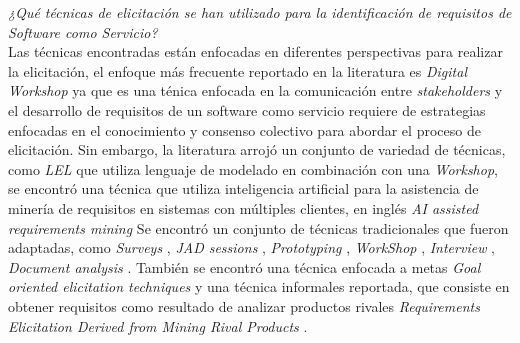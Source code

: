 \documentclass[conference,onecolumn,10pt]{IEEEtran}
\begin{document}
\emph{¿Qué técnicas de elicitación se han utilizado para la identificación de requisitos de Software como Servicio?} \\
Las técnicas encontradas están enfocadas en diferentes perspectivas para realizar la elicitación, el enfoque más 
frecuente reportado en la literatura es \emph{Digital Workshop} \cite{EF-1,EF-4,EF-5,EF-8,EF-9,EF-13,EF-15} 
ya que es una ténica enfocada en la comunicación
entre \emph{stakeholders} y el desarrollo de requisitos de un software como servicio requiere de estrategias 
enfocadas en el conocimiento y consenso colectivo para abordar el proceso de elicitación. 
Sin embargo, la literatura arrojó un conjunto de variedad de técnicas, como \emph{LEL} \cite{EF-6} que utiliza lenguaje 
de modelado en combinación con una \emph{Workshop}, se encontró una técnica que utiliza inteligencia artificial 
para la asistencia de minería de requisitos en sistemas con múltiples clientes, en inglés \emph{AI assisted requirements mining} \cite{EF-5}
Se encontró un conjunto de técnicas tradicionales que fueron adaptadas, como \emph{Surveys} \cite{EF-2}, \emph{JAD sessions} \cite{EF-1}, \emph{Prototyping} \cite{EF-2},
\emph{WorkShop} \cite{EF-14, EF-6}, \emph{Interview} \cite{EF-11}, \emph{Document analysis} \cite{EF-15}.
También se encontró una técnica enfocada a metas \emph{Goal oriented elicitation techniques} \cite{EF-18} y una técnica informales reportada, que 
consiste en obtener requisitos como resultado de analizar productos rivales \emph{Requirements Elicitation Derived from Mining Rival Products} \cite{EF-19}.
\end{document}
